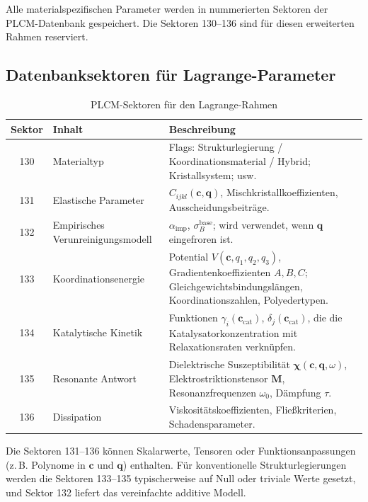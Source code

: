 \documentclass[12pt,a4paper]{article}
\begin{document}
Alle materialspezifischen Parameter werden in nummerierten Sektoren der PLCM-Datenbank gespeichert. Die Sektoren 130–136 sind für diesen erweiterten Rahmen reserviert.

\subsection{Datenbanksektoren für Lagrange-Parameter}
\label{subsec:sectors}

\begin{table}[htbp]
\centering
\caption{PLCM-Sektoren für den Lagrange-Rahmen}
\label{tab:sectors}
\begin{tabular}{clp{8cm}}
	\toprule
	\textbf{Sektor} & \textbf{Inhalt} & \textbf{Beschreibung} \\
	\midrule
	130 & Materialtyp & Flags: Strukturlegierung / Koordinationsmaterial / Hybrid; Kristallsystem; usw. \\
	131 & Elastische Parameter & \(C_{ijkl}(\mathbf{c}, \mathbf{q})\), Mischkristallkoeffizienten, Ausscheidungsbeiträge. \\
	132 & Empirisches Verunreinigungsmodell & \(\alpha_{\mathrm{imp}}\), \(\sigma_B^{\mathrm{base}}\); wird verwendet, wenn \(\mathbf{q}\) eingefroren ist. \\
	133 & Koordinationsenergie & Potential \(V(\mathbf{c}, q_1,q_2,q_3)\), Gradientenkoeffizienten \(A,B,C\); Gleichgewichtsbindungslängen, Koordinationszahlen, Polyedertypen. \\
	134 & Katalytische Kinetik & Funktionen \(\gamma_i(\mathbf{c}_{\mathrm{cat}})\), \(\delta_j(\mathbf{c}_{\mathrm{cat}})\), die die Katalysatorkonzentration mit Relaxationsraten verknüpfen. \\
	135 & Resonante Antwort & Dielektrische Suszeptibilität \(\boldsymbol{\chi}(\mathbf{c},\mathbf{q},\omega)\), Elektrostriktionstensor \(\mathbf{M}\), Resonanzfrequenzen \(\omega_0\), Dämpfung \(\tau\). \\
	136 & Dissipation & Viskositätskoeffizienten, Fließkriterien, Schadensparameter. \\
	\bottomrule
\end{tabular}
\end{table}

Die Sektoren 131–136 können Skalarwerte, Tensoren oder Funktionsanpassungen (z. B. Polynome in \(\mathbf{c}\) und \(\mathbf{q}\)) enthalten. Für konventionelle Strukturlegierungen werden die Sektoren 133–135 typischerweise auf Null oder triviale Werte gesetzt, und Sektor 132 liefert das vereinfachte additive Modell.
\end{document}
